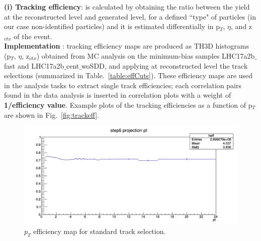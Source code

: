 

{\bf \normalsize (i) Tracking efficiency}: is calculated by obtaining the ratio between the yield at the reconstructed level and generated level, for a defined ``type" of particles (in our case non-identified particles) and it is estimated differentially in p$_T$, $\eta$, and z$_{vtx}$ of the event.\\
{\bf Implementation }: tracking efficiency maps are produced as TH3D histograms (p$_T$, $\eta$, z$_{vtx}$) obtained from MC analysis on the minimum-bias samples LHC17a2b$\_$fast and LHC17a2b$\_$cent$\_$woSDD, and applying at reconstructed level the track selections (summarized in Table.~\ref{table:effCuts}). These efficiency maps are used in the analysis tasks to extract single track efficiencies; each correlation pairs found in the data analysis is inserted in correlation plots with a weight of {\bf 1/efficiency value}. Example plots of the tracking efficiencies as a function of p$_T$ are shown in Fig.~\ref{fig:trackeff}.




\begin{figure}[h]
	\centering
	\includegraphics[scale=0.35]{figures/Effs/TrackEfficiencyPlots_zVtxbin5_a2b_default_1Dmap.png}
	\caption{$p_T$ efficiency map for standard track selection.}
	\label{fig:trackeffvsspecies}	
\end{figure}

